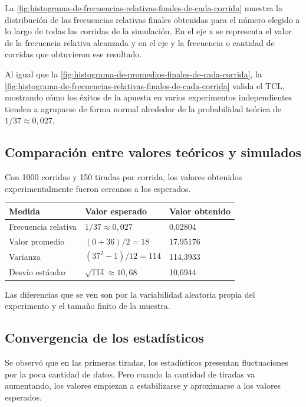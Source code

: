 \documentclass{article}
\begin{document}
La \cref{fig:histograma-de-frecuencias-relativas-finales-de-cada-corrida} muestra la distribución de las frecuencias relativas finales obtenidas para el número elegido a lo largo de todas las
corridas de la simulación. En el eje x se representa el valor de la frecuencia relativa alcanzada y en el eje y la frecuencia o 
cantidad de corridas que obtuvieron ese resultado.

Al igual que la \cref{fig:histograma-de-promedios-finales-de-cada-corrida}, la \cref{fig:histograma-de-frecuencias-relativas-finales-de-cada-corrida} valida el TCL, mostrando cómo los éxitos de la apuesta en varios experimentos
independientes tienden a agruparse de forma normal alrededor de la probabilidad teórica de $1/37 \approx 0,027$.

\subsection{Comparación entre valores teóricos y simulados}

Con 1000 corridas y 150 tiradas por corrida, los valores obtenidos experimentalmente fueron cercanos a los esperados.

\begin{table}[h]
  \centering
  \begin{tabular}{lll}
    \toprule
    \textbf{Medida} & \textbf{Valor esperado} & \textbf{Valor obtenido} \\
    \midrule
    Frecuencia relativa & $1/37 \approx 0,027$ & 0,02804 \\
    Valor promedio & $(0+36)/2 = 18$ & 17,95176 \\
    Varianza & $(37^2-1)/12 = 114$ & 114,3933 \\
    Desvío estándar & $\sqrt{114} \approx 10,68$ & 10,6944 \\
    \bottomrule
  \end{tabular}
  \label{tab:comparacion-teoricos-simulados}
\end{table}

Las diferencias que se ven son por la variabilidad aleatoria propia del experimento y el tamaño finito de la muestra.

\subsection{Convergencia de los estadísticos}

Se observó que en las primeras tiradas, los estadísticos presentan fluctuaciones por la poca cantidad de datos. Pero cuando la 
cantidad de tiradas va aumentando, los valores empiezan a estabilizarse y aproximarse a los valores esperados.
\end{document}
